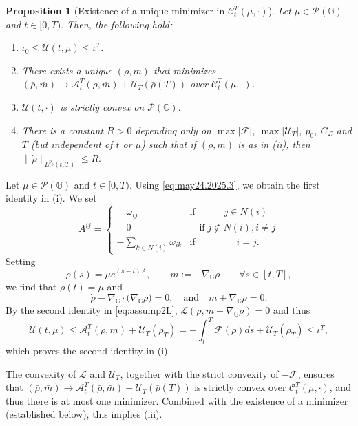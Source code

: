 \documentclass[10pt]{article}
\newtheorem{proposition}[theorem]{Proposition}
\numberwithin{equation}{section}
\newcommand{\cA}{ \mathcal{A}}
\newcommand{\cC}{ \mathcal{C}}
\newcommand{\cF}{ \mathcal{F}}
\newcommand{\cL}{ \mathcal{L}}
\newcommand{\cP}{ \mathcal{P}}
\newcommand{\cU}{ \mathcal{U}}
\newcommand{\bG}{\mathbb G}
\def\cL{\mathcal{L}}
\begin{document}
%
%
\begin{proposition}[Existence of a unique minimizer in $\cC_t^T(\mu, \cdot)$]\label{prop:action-minimizer} Let $\mu \in \cP(\bG)$ and  $t\in [0,T).$ Then, the following hold: 
\begin{enumerate}
\item[(i)]  $ \iota_0 \leq \cU(t, \mu) \leq \iota^T$.
\item[(ii)] There exists a unique $(\rho, m)$ that minimizes $(\bar \rho, \bar m) \to \cA_t^T(\rho, \bar m)+\cU_T(\bar \rho(T))$ over $\cC_t^T(\mu, \cdot)$.  
\item[(iii)] $\cU(t, \cdot)$ is strictly convex on $\cP(\bG).$
\item[(iv)] There is a constant $R>0$ depending only on  $\max |\cF|$, $\max |\cU_T|$, $p_0$, $C_{\cL}$ and $T$ (but independent of $t$ or $\mu$) such that if   $(\rho, m)$ is as in (ii), then $\|\dot \rho\|_{L^{p_0}(t, T)} \leq R.$
\end{enumerate}
\end{proposition}
%
\proof{} Let $\mu \in \cP(\bG)$ and  $t\in [0,T).$ Using \eqref{eq:may24.2025.3}, we obtain the first identity in (i). We set 
\[
A^{ij}= \left\{
     \begin{array}{lr}
       \quad  \omega_{ij}& \text{if} \quad \qquad j\in N(i)  \\
       \quad 0 & \quad \text{if} \;  j\not \in N(i), i \not =j\\
       -\sum_{k \in N(i)} \omega_{ik}  & \text{if} \; \qquad \qquad i=j.
     \end{array}
   \right.
\]
Setting 
\[
\rho(s)=\mu e^{(s-t)A}, \qquad m:=- \nabla_\bG \rho \qquad \forall s \in [t, T], 
\]
we find that $\rho(t)=\mu$ and 
\[\dot \rho-\nabla_\bG \cdot \big( \nabla_\bG \rho \big)=0, \quad \text{and} \quad m+ \nabla_\bG \rho=0.\]
By the second identity in \eqref{eq:assump2L}, $\cL(\rho,  m+ \nabla_\bG \rho)=0$ and thus  
\begin{equation}\label{eq:aug1.2025.4new}
\cU(t, \mu) \leq \cA_t^T(\rho,  m)+\cU_T(\rho_T)= -\int_t^T \cF(\rho)ds+\cU_T(\rho_T) \leq \iota^T,
\end{equation}
which proves the second identity in (i).

The convexity of $\cL$ and $\cU_T$, together with the strict convexity of $-\cF$, ensures that $(\bar \rho, \bar m) \to \cA_t^T(\bar \rho, \bar m)+\cU_T(\bar \rho(T))$ is strictly convex over $\cC_t^T(\mu, \cdot)$, and thus there is at most one minimizer. Combined with the existence of a minimizer (established below), this implies (iii).
\end{document}
